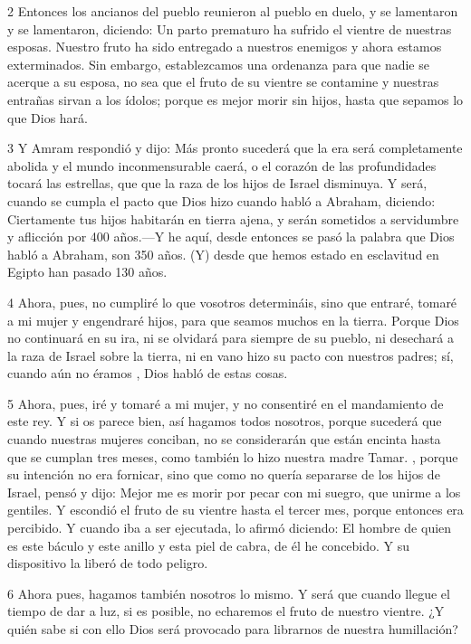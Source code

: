 \par 2 Entonces los ancianos del pueblo reunieron al pueblo en duelo, y se lamentaron y se lamentaron, diciendo: Un parto prematuro ha sufrido el vientre de nuestras esposas. Nuestro fruto ha sido entregado a nuestros enemigos y ahora estamos exterminados. Sin embargo, establezcamos una ordenanza para que nadie se acerque a su esposa, no sea que el fruto de su vientre se contamine y nuestras entrañas sirvan a los ídolos; porque es mejor morir sin hijos, hasta que sepamos lo que Dios hará.

\par 3 Y Amram respondió y dijo: Más pronto sucederá que la era será completamente abolida y el mundo inconmensurable caerá, o el corazón de las profundidades tocará las estrellas, que que la raza de los hijos de Israel disminuya. Y será, cuando se cumpla el pacto que Dios hizo cuando habló a Abraham, diciendo: Ciertamente tus hijos habitarán en tierra ajena, y serán sometidos a servidumbre y aflicción por 400 años.—Y he aquí, desde entonces se pasó la palabra que Dios habló a Abraham, son 350 años. (Y) desde que hemos estado en esclavitud en Egipto han pasado 130 años.

\par 4 Ahora, pues, no cumpliré lo que vosotros determináis, sino que entraré, tomaré a mi mujer y engendraré hijos, para que seamos muchos en la tierra. Porque Dios no continuará en su ira, ni se olvidará para siempre de su pueblo, ni desechará a la raza de Israel sobre la tierra, ni en vano hizo su pacto con nuestros padres; sí, cuando aún no éramos , Dios habló de estas cosas.

\par 5 Ahora, pues, iré y tomaré a mi mujer, y no consentiré en el mandamiento de este rey. Y si os parece bien, así hagamos todos nosotros, porque sucederá que cuando nuestras mujeres conciban, no se considerarán que están encinta hasta que se cumplan tres meses, como también lo hizo nuestra madre Tamar. , porque su intención no era fornicar, sino que como no quería separarse de los hijos de Israel, pensó y dijo: Mejor me es morir por pecar con mi suegro, que unirme a los gentiles. Y escondió el fruto de su vientre hasta el tercer mes, porque entonces era percibido. Y cuando iba a ser ejecutada, lo afirmó diciendo: El hombre de quien es este báculo y este anillo y esta piel de cabra, de él he concebido. Y su dispositivo la liberó de todo peligro.

\par 6 Ahora pues, hagamos también nosotros lo mismo. Y será que cuando llegue el tiempo de dar a luz, si es posible, no echaremos el fruto de nuestro vientre. ¿Y quién sabe si con ello Dios será provocado para librarnos de nuestra humillación?

